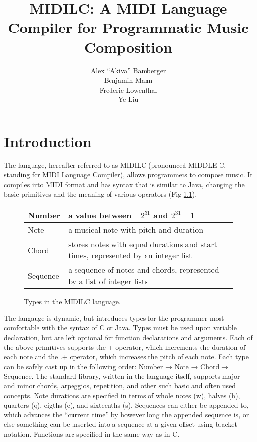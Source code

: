 \documentclass[12pt,A4]{book}
\title{MIDILC:  A MIDI Language Compiler for Programmatic Music Composition}
\author{Alex ``Akiva'' Bamberger \\ Benjamin Mann \\ Frederic Lowenthal \\ Ye Liu}
\date{}
\begin{document}
\maketitle
\newpage
\tableofcontents
\newpage

\chapter{Introduction}
The language, hereafter referred to as MIDILC (pronounced MIDDLE C, standing for MIDI
Language Compiler), allows programmers to compose music. It compiles into MIDI format and
has syntax that is similar to Java, changing the basic primitives and the meaning of various
operators (Fig \ref{fig:types_in_midilc}).

\begin{figure}
\center
\begin{tabular}{|p{}|p{}|}
\hline
Number & a value between $-2^{31}$ and $2^{31}-1$\\ \hline
Note & a musical note with pitch and duration \\ \hline
Chord & stores notes with equal durations and start times, represented by an integer list \\ \hline
Sequence & a sequence of notes and chords, represented by a list of integer lists \\ \hline
\end{tabular}
\caption{Types in the MIDILC language. }
\label{fig:types_in_midilc}
\end{figure}

The langauge is dynamic, but introduces types for the programmer most comfortable with the syntax of C or Java. Types must be used upon variable declaration, but are left optional for function declarations and arguments. Each of the above primitives supports the + operator, which increments the duration of each note and the .+ operator, which increases the pitch of each note. Each type can be safely cast up in the following order: Number → Note → Chord → Sequence. The standard library, written in the language itself, supports major and minor chords, arpeggios, repetition, and other such basic and often used concepts. Note durations are specified in terms of whole notes (w), halves (h), quarters (q), eigths (e), and sixteenths (s). Sequences can either be appended to, which advances the ``current time'' by however long the appended sequence is, or else something can be inserted into a sequence at a given offset using bracket notation. Functions are specified in the same way as in C.
\end{document}
